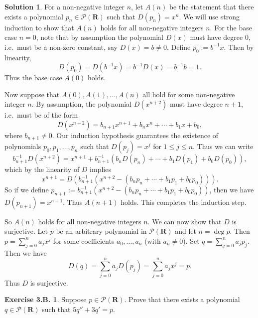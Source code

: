 \documentclass[12pt]{article}
\theoremstyle{definition}
\theoremstyle{exercise}
\newtheorem{exercise}{Exercise 3.B.}
\theoremstyle{solution}
\newtheorem*{solution}{Solution}
\newcommand{\poly}{\mathcal{P}}
\newcommand{\R}{\mathbf{R}}
\begin{document}
\begin{solution}
    For a non-negative integer \( n \), let \( A(n) \) be the statement that there exists a polynomial \( p_n \in \poly(\R) \) such that \( D(p_n) = x^n \). We will use strong induction to show that \( A(n) \) holds for all non-negative integers \( n \). For the base case \( n = 0 \), note that by assumption the polynomial \( D(x) \) must have degree 0, i.e.\ must be a non-zero constant, say \( D(x) = b \neq 0 \). Define \( p_0 := b^{-1} x \). Then by linearity,
    \[
        D(p_0) = D(b^{-1} x) = b^{-1} D(x) = b^{-1} b = 1.
    \]
    Thus the base case \( A(0) \) holds.

    Now suppose that \( A(0), A(1), \ldots, A(n) \) all hold for some non-negative integer \( n \). By assumption, the polynomial \( D(x^{n+2}) \) must have degree \( n + 1 \), i.e.\ must be of the form
    \[
        D(x^{n+2}) = b_{n+1} x^{n+1} + b_n x^n + \cdots + b_1 x + b_0,
    \]
    where \( b_{n+1} \neq 0 \). Our induction hypothesis guarantees the existence of polynomials \( p_0, p_1, \ldots, p_n \) such that \( D(p_j) = x^j \) for \( 1 \leq j \leq n \). Thus we can write
    \[
        b_{n+1}^{-1} D(x^{n+2}) = x^{n+1} + b_{n+1}^{-1} (b_n D(p_n) + \cdots + b_1 D(p_1) + b_0 D(p_0)),
    \]
    which by the linearity of \( D \) implies
    \[
        x^{n+1} = D(b_{n+1}^{-1}(x^{n+2} - (b_n p_n + \cdots + b_1 p_1 + b_0 p_0))).
    \]
    So if we define \( p_{n+1} := b_{n+1}^{-1}(x^{n+2} - (b_n p_n + \cdots + b_1 p_1 + b_0 p_0)) \), then we have \( D(p_{n+1}) = x^{n+1} \). Thus \( A(n+1) \) holds. This completes the induction step.

    So \( A(n) \) holds for all non-negative integers \( n \). We can now show that \( D \) is surjective. Let \( p \) be an arbitrary polynomial in \( \poly(\R) \) and let \( n = \deg p \). Then \( p = \sum_{j=0}^n a_j x^j \) for some coefficients \( a_0, \ldots, a_n \) (with \( a_n \neq 0 \)). Set \( q = \sum_{j=0}^n a_j p_j \). Then we have
    \[
        D(q) = \sum_{j=0}^n a_j D(p_j) = \sum_{j=0}^n a_j x^j = p.  
    \]
    Thus \( D \) is surjective.
\end{solution}

\begin{exercise}
\label{ex:27}
    Suppose \( p \in \poly(\R) \). Prove that there exists a polynomial \( q \in \poly(\R) \) such that \( 5q'' + 3q' = p \).

\end{exercise}
\end{document}
